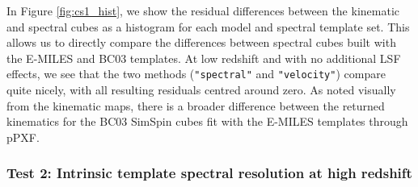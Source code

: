 \documentclass[
  journal=pasa,
  manuscript=research-paper, %
  year=2020,
  volume=37,
]{cup-journal}
\begin{document}
In Figure \ref{fig:cs1_hist}, we show the residual differences between the kinematic and spectral cubes as a histogram for each model and spectral template set. 
This allows us to directly compare the differences between spectral cubes built with the E-MILES and \textsc{BC03} templates.
At low redshift and with no additional LSF effects, we see that the two methods (\texttt{"spectral"} and \texttt{"velocity"}) compare quite nicely, with all resulting residuals centred around zero.
As noted visually from the kinematic maps, there is a broader difference between the returned kinematics for the \textsc{BC03} SimSpin cubes fit with the E-MILES templates through pPXF.






\subsubsection*{Test 2: Intrinsic template spectral resolution at high redshift}
\end{document}
